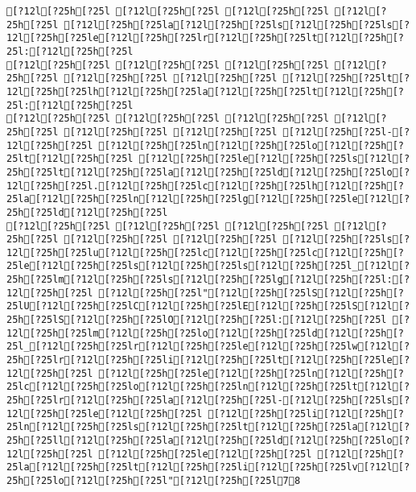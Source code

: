 \documentclass{scrartcl}
\begin{document}
\begin{Verbatim}
[?12l[?25h[?25l [?12l[?25h[?25l [?12l[?25h[?25l [?12l[?25h[?25l [?12l[?25h[?25la[?12l[?25h[?25ls[?12l[?25h[?25ls[?12l[?25h[?25le[?12l[?25h[?25lr[?12l[?25h[?25lt[?12l[?25h[?25l:[?12l[?25h[?25l
[?12l[?25h[?25l [?12l[?25h[?25l [?12l[?25h[?25l [?12l[?25h[?25l [?12l[?25h[?25l [?12l[?25h[?25l [?12l[?25h[?25lt[?12l[?25h[?25lh[?12l[?25h[?25la[?12l[?25h[?25lt[?12l[?25h[?25l:[?12l[?25h[?25l
[?12l[?25h[?25l [?12l[?25h[?25l [?12l[?25h[?25l [?12l[?25h[?25l [?12l[?25h[?25l [?12l[?25h[?25l [?12l[?25h[?25l-[?12l[?25h[?25l [?12l[?25h[?25ln[?12l[?25h[?25lo[?12l[?25h[?25lt[?12l[?25h[?25l [?12l[?25h[?25le[?12l[?25h[?25ls[?12l[?25h[?25lt[?12l[?25h[?25la[?12l[?25h[?25ld[?12l[?25h[?25lo[?12l[?25h[?25l.[?12l[?25h[?25lc[?12l[?25h[?25lh[?12l[?25h[?25la[?12l[?25h[?25ln[?12l[?25h[?25lg[?12l[?25h[?25le[?12l[?25h[?25ld[?12l[?25h[?25l
[?12l[?25h[?25l [?12l[?25h[?25l [?12l[?25h[?25l [?12l[?25h[?25l [?12l[?25h[?25l [?12l[?25h[?25l [?12l[?25h[?25ls[?12l[?25h[?25lu[?12l[?25h[?25lc[?12l[?25h[?25lc[?12l[?25h[?25le[?12l[?25h[?25ls[?12l[?25h[?25ls[?12l[?25h[?25l_[?12l[?25h[?25lm[?12l[?25h[?25ls[?12l[?25h[?25lg[?12l[?25h[?25l:[?12l[?25h[?25l [?12l[?25h[?25l"[?12l[?25h[?25lS[?12l[?25h[?25lU[?12l[?25h[?25lC[?12l[?25h[?25lE[?12l[?25h[?25lS[?12l[?25h[?25lS[?12l[?25h[?25lO[?12l[?25h[?25l:[?12l[?25h[?25l [?12l[?25h[?25lm[?12l[?25h[?25lo[?12l[?25h[?25ld[?12l[?25h[?25l_[?12l[?25h[?25lr[?12l[?25h[?25le[?12l[?25h[?25lw[?12l[?25h[?25lr[?12l[?25h[?25li[?12l[?25h[?25lt[?12l[?25h[?25le[?12l[?25h[?25l [?12l[?25h[?25le[?12l[?25h[?25ln[?12l[?25h[?25lc[?12l[?25h[?25lo[?12l[?25h[?25ln[?12l[?25h[?25lt[?12l[?25h[?25lr[?12l[?25h[?25la[?12l[?25h[?25l-[?12l[?25h[?25ls[?12l[?25h[?25le[?12l[?25h[?25l [?12l[?25h[?25li[?12l[?25h[?25ln[?12l[?25h[?25ls[?12l[?25h[?25lt[?12l[?25h[?25la[?12l[?25h[?25ll[?12l[?25h[?25la[?12l[?25h[?25ld[?12l[?25h[?25lo[?12l[?25h[?25l [?12l[?25h[?25le[?12l[?25h[?25l [?12l[?25h[?25la[?12l[?25h[?25lt[?12l[?25h[?25li[?12l[?25h[?25lv[?12l[?25h[?25lo[?12l[?25h[?25l"[?12l[?25h[?25l78


\end{Verbatim}
\end{document}
